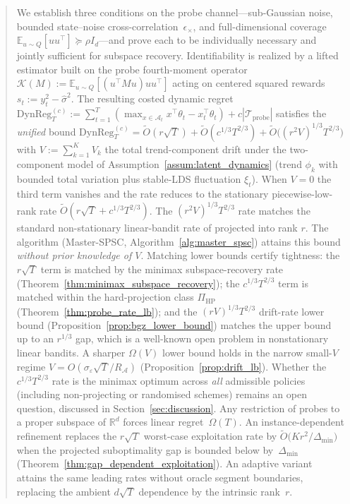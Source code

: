 \documentclass[11pt]{article}
\newcommand{\R}{\mathbb{R}}
\newcommand{\E}{\mathbb{E}}
\newcommand{\cA}{\mathcal{A}}
\newcommand{\cTprobe}{\mathcal{T}_{\mathrm{probe}}}
\newcommand{\DynReg}{\mathrm{DynReg}}
\begin{document}
\begin{abstract}
We establish three conditions on the probe channel---sub-Gaussian noise,
bounded state--noise cross-correlation~$\epsilon_\times$, and
full-dimensional coverage $\E_{u\sim Q}[uu^\top]\succeq\rho I_d$---and prove
each to be individually necessary and jointly sufficient for subspace
recovery.  Identifiability is realized by a lifted estimator built on the
probe fourth-moment operator
$\mathcal{K}(M):=\E_{u\sim Q}[(u^\top Mu)uu^\top]$ acting on centered
squared rewards $s_t:=y_t^2-\hat\sigma^2$.  The resulting costed dynamic
regret
\(
  \DynReg_T^{(c)}:=\sum_{t=1}^T(\max_{x\in\cA_t}x^\top\theta_t-x_t^\top\theta_t)+c|\cTprobe|
\)
satisfies the \emph{unified} bound
\(
  \DynReg_T^{(c)}=\widetilde O(r\sqrt T)+\widetilde O(c^{1/3}T^{2/3})
  +\widetilde O\!\bigl((r^2V)^{1/3}T^{2/3}\bigr)
\)
with $V:=\sum_{k=1}^K V_k$ the total trend-component drift under the
two-component model of Assumption~\ref{assum:latent_dynamics}
(trend $\phi_k$ with bounded total variation plus stable-LDS fluctuation
$\xi_t$).  When $V=0$ the third term vanishes and the rate reduces to the
stationary piecewise-low-rank rate
$\widetilde O(r\sqrt T+c^{1/3}T^{2/3})$.  The $(r^2V)^{1/3}T^{2/3}$ rate
matches the standard non-stationary linear-bandit rate of
\citet{russac2019weighted,cheung2019learning} projected into rank $r$.
The algorithm (Master-SPSC, Algorithm~\ref{alg:master_spsc}) attains this
bound \emph{without prior knowledge of $V$}.
Matching lower bounds certify tightness: the $r\sqrt T$ term is
matched by the minimax subspace-recovery rate
(Theorem~\ref{thm:minimax_subspace_recovery}); the $c^{1/3}T^{2/3}$ term is
matched within the hard-projection class $\Pi_{\mathrm{HP}}$
(Theorem~\ref{thm:probe_rate_lb}); and the $(rV)^{1/3}T^{2/3}$ drift-rate
lower bound (Proposition~\ref{prop:bgz_lower_bound}) matches the upper bound
up to an $r^{1/3}$ gap, which is a well-known open problem in nonstationary
linear bandits.  A sharper $\Omega(V)$ lower bound holds in the narrow
small-$V$ regime $V=O(\sigma_\varepsilon\sqrt T/R_\cA)$
(Proposition~\ref{prop:drift_lb}).
Whether the $c^{1/3}T^{2/3}$ rate is the minimax optimum across \emph{all}
admissible policies (including non-projecting or randomised schemes)
remains an open question, discussed in Section~\ref{sec:discussion}.  Any restriction of probes
to a proper subspace of $\R^d$ forces linear regret~$\Omega(T)$.  An instance-dependent refinement replaces the
$r\sqrt T$ worst-case exploitation rate by
$\widetilde O\bigl(Kr^2/\Delta_{\min}\bigr)$ when the projected
suboptimality gap is bounded below by~$\Delta_{\min}$
(Theorem~\ref{thm:gap_dependent_exploitation}).  An adaptive variant attains
the same leading rates without oracle segment boundaries, replacing the
ambient $d\sqrt T$ dependence by the intrinsic rank~$r$.
\end{abstract}
\end{document}
